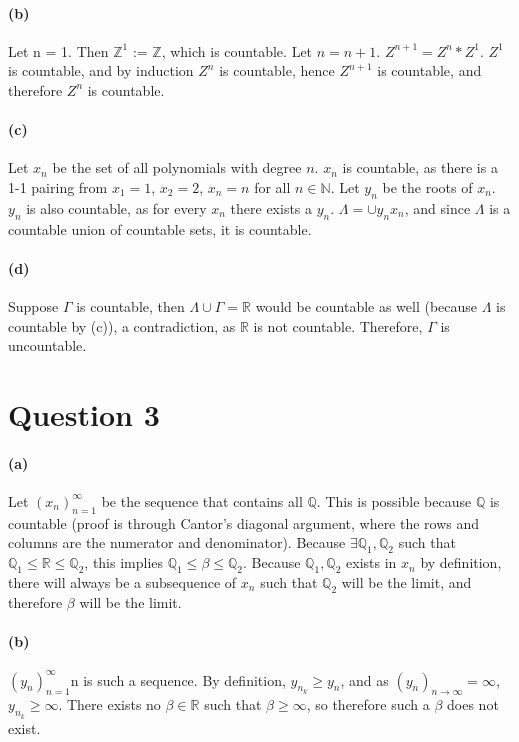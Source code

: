 \documentclass[10pt,letter]{article}
\begin{document}
\paragraph{(b)} 
Let n = 1. Then $\mathbb{Z}^1$ := $\mathbb{Z}$, which is countable. Let $n = n + 1$. $Z^{n+1} = Z^n * Z^1$. $Z^1$ is countable, and by induction $Z^n$ is countable, hence $Z^{n+1}$ is countable, and therefore $Z^n$ is countable. 

\paragraph{(c)} 
Let $x_n$ be the set of all polynomials with degree $n$. $x_n$ is countable, as there is a 1-1 pairing from $x_1 = 1$, $x_2 = 2$, $x_n = n$ for all $n \in \mathbb{N}$. Let $y_n$ be the roots of $x_n$. $y_n$ is also countable, as for every $x_n$ there exists a $y_n$. $\Lambda = \cup y_n x_n$, and since $\Lambda$ is a countable union of countable sets, it is countable. 

\paragraph{(d)} 
Suppose $\Gamma$ is countable, then $\Lambda \cup \Gamma = \mathbb{R}$ would be countable as well (because $\Lambda$ is countable by (c)), a contradiction, as $\mathbb{R}$ is not countable. Therefore, $\Gamma$ is uncountable.


\section*{Question 3}

\paragraph{(a)} 
Let $(x_n)_{n=1}^\infty$ be the sequence that contains all $\mathbb{Q}$. This is possible because $\mathbb{Q}$ is countable (proof is through Cantor's diagonal argument, where the rows and columns are the numerator and denominator). Because $\exists \mathbb{Q}_1, \mathbb{Q}_2$ such that $\mathbb{Q}_1 \leq \mathbb{R} \leq \mathbb{Q}_2$, this implies $\mathbb{Q}_1 \leq \beta \leq \mathbb{Q}_2$. Because $\mathbb{Q}_1, \mathbb{Q}_2$ exists in $x_n$ by definition, there will always be a subsequence of $x_n$ such that $\mathbb{Q}_2$ will be the limit, and therefore $\beta$ will be the limit. 


\paragraph{(b)} 
$(y_n)_{n=1}^\infty$n is such a sequence. By definition, $y_{n_k} \geq y_n$, and as $(y_n)_{n \rightarrow\infty} = \infty$, $y_{n_k} \geq \infty$. There exists no $\beta \in \mathbb{R}$ such that $\beta \geq \infty$, so therefore such a $\beta$ does not exist. 
\end{document}

